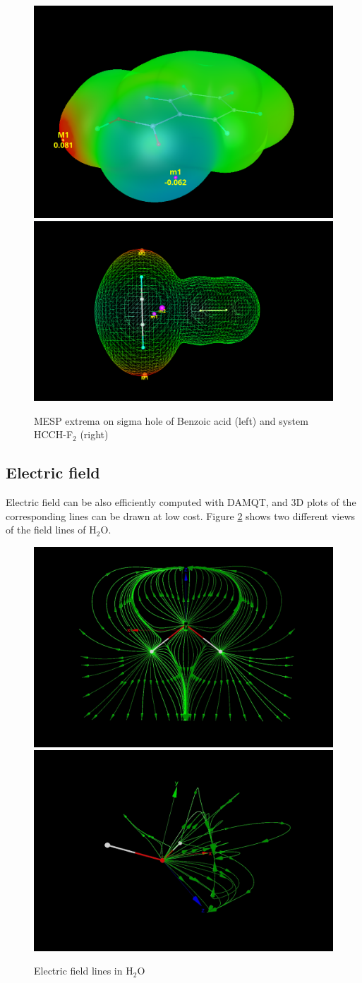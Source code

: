 \documentclass[10pt]{article}
\begin{document}
\vspace*{5mm}
\begin{figure}[H]
\begin{center}
\hspace*{5mm}
\includegraphics[width=.34\linewidth]{damqt320_benzoic_sgh.png}
\hspace*{5mm}
\includegraphics[width=.4\linewidth]{damqt320_sg_hole_mesp_extrema.png}
\end{center}
\caption[MESP extrema on sigma hole]{ MESP extrema on sigma hole of Benzoic acid (left)
and system HCCH-F$_2$ (right)
\label{fig:6_6_1}}
\end{figure}


\subsection{Electric field \label{sec:6.7} }

Electric field can be also efficiently computed with DAMQT, and 3D plots of
the corresponding lines can be drawn at low cost. Figure \ref{fig:6_7_1} shows
two different views of the field lines of H$_2$O. 

\begin{figure}[H]
\begin{center}
\includegraphics[width=.35\linewidth]{H2O-field-1.png}
\hspace*{5mm}
\includegraphics[width=.35\linewidth]{H2O-field-2.png}
\end{center}
\caption{ Electric field lines in H$_2$O
\label{fig:6_7_1}}
\end{figure}
\end{document}
